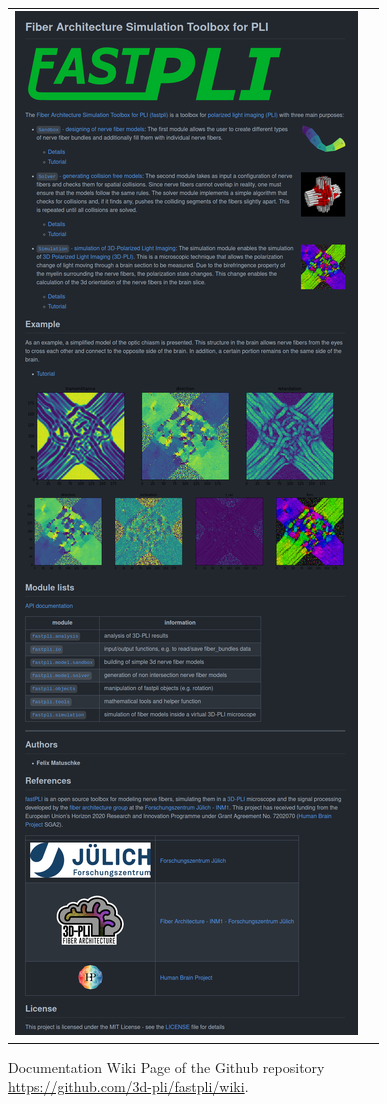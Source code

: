 \begin{figure}[!t]
{{\begin{tabular}{c|c}
 	\includegraphics[valign=T,trim=0 0 0 1580, clip]{gfx/fastpli/fastpli_wiki.png} \\
    \end{tabular}
    }}
	\caption[Documentation]{Documentation Wiki Page of the Github repository \url{https://github.com/3d-pli/fastpli/wiki}.}
	\label{fig:fastpli_wiki}
\end{figure}

